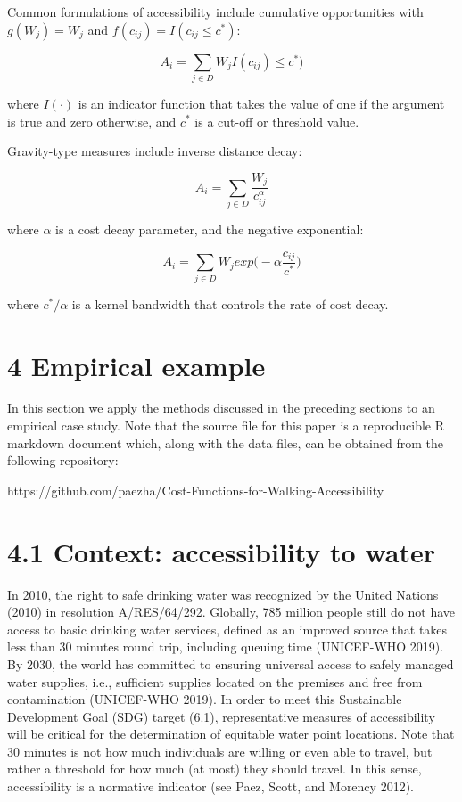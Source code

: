 \documentclass[]{elsarticle} %
\begin{document}
Common formulations of accessibility include cumulative opportunities
with \(g(W_j)=W_j\) and \(f(c_{ij})=I(c_{ij}\le c^*)\):

\begin{equation} \label{eq:9}A_i = \sum_{j\in D}W_jI(c_{ij})\le c^*)\end{equation}

\noindent where \(I(\cdot)\) is an indicator function that takes the
value of one if the argument is true and zero otherwise, and \(c^*\) is
a cut-off or threshold value.

Gravity-type measures include inverse distance decay:

\begin{equation} \label{eq:10}A_i = \sum_{j\in D}\frac{W_j}{c_{ij}^\alpha}\end{equation}

\noindent where \(\alpha\) is a cost decay parameter, and the negative
exponential:

\begin{equation} \label{eq:11}A_i = \sum_{j\in D}W_jexp\Big(-\alpha \frac{c_{ij}}{c^*}\Big)\end{equation}

\noindent where \(c^*/\alpha\) is a kernel bandwidth that controls the
rate of cost decay.

\hypertarget{empirical-example}{%
\section{4 Empirical example}\label{empirical-example}}

In this section we apply the methods discussed in the preceding sections
to an empirical case study. Note that the source file for this paper is
a reproducible R markdown document which, along with the data files, can
be obtained from the following repository:

https://github.com/paezha/Cost-Functions-for-Walking-Accessibility

\hypertarget{context-accessibility-to-water}{%
\section{4.1 Context: accessibility to
water}\label{context-accessibility-to-water}}

In 2010, the right to safe drinking water was recognized by the United
Nations (2010) in resolution A/RES/64/292. Globally, 785 million people
still do not have access to basic drinking water services, defined as an
improved source that takes less than 30 minutes round trip, including
queuing time (UNICEF-WHO 2019). By 2030, the world has committed to
ensuring universal access to safely managed water supplies, i.e.,
sufficient supplies located on the premises and free from contamination
(UNICEF-WHO 2019). In order to meet this Sustainable Development Goal
(SDG) target (6.1), representative measures of accessibility will be
critical for the determination of equitable water point locations. Note
that 30 minutes is not how much individuals are willing or even able to
travel, but rather a threshold for how much (at most) they should
travel. In this sense, accessibility is a normative indicator (see Paez,
Scott, and Morency 2012).
\end{document}
